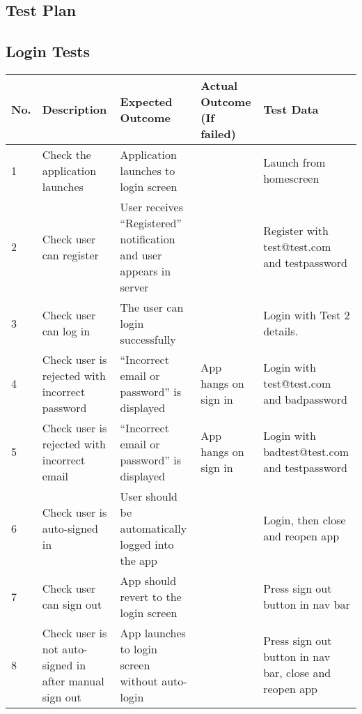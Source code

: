\begin{landscape}
\chapter{Test Plan}

\section{Login Tests}
\begin{tabularx}{\linewidth}{p{1cm} X X X X}
\textbf{No.} & \textbf{Description}                    & \textbf{Expected Outcome}                                  & \textbf{Actual Outcome (If failed)} & \textbf{Test Data}                                          \\ \hline
1   & Check the application launches                         & Application launches to login screen                          &                            & Launch from homescreen                                 \\ \hline
2   & Check user can register                                & User receives ``Registered'' notification and user appears in server &                            & Register with test@test.com and testpassword           \\ \hline
3   & Check user can log in                                  & The user can login successfully                                    &                            & Login with Test 2 details.                             \\ \hline
4   & Check user is rejected with incorrect password         & ``Incorrect email or password'' is displayed                         & App hangs on sign in       & Login with test@test.com and badpassword               \\ \hline
5   & Check user is rejected with incorrect email            & ``Incorrect email or password'' is displayed                         & App hangs on sign in       & Login with badtest@test.com and testpassword           \\ \hline
6   & Check user is auto-signed in                           & User should be automatically logged into the app                   &                            & Login, then close and reopen app                       \\ \hline
7   & Check user can sign out                                & App should revert to the login screen                              &                            & Press sign out button in nav bar                       \\ \hline
8   & Check user is not auto-signed in after manual sign out & App launches to login screen without auto-login                    &                            & Press sign out button in nav bar, close and reopen app \\ \hline
\end{tabularx} 


\end{landscape}
